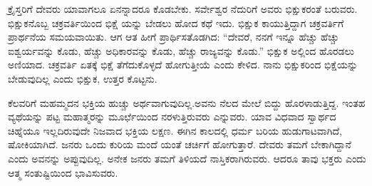 ಕ್ರೈಸ್ತರಿಗೆ ದೇವರು ಯಾವಾಗಲೂ ಏನನ್ನಾದರೂ ಕೊಡಬೇಕು. ಸರ್ವೇಶ್ವರ ನೆದುರಿಗೆ ಅವರು ಭಿಕ್ಷುಕರಂತೆ ಬರುವರು. ಭಿಕ್ಷುಕನೊಬ್ಬ ಚಕ್ರವರ್ತಿಯಿಂದ ಭಿಕ್ಷೆ ಯನ್ನು ಬೇಡಲು ಹೋದ ಕಥೆ ಇದು. ಭಿಕ್ಷುಕ ಕಾಯುತ್ತಿದ್ದಾಗ ಚಕ್ರವರ್ತಿಗೆ ಪ್ರಾರ್ಥನೆಯ ಸಮಯವಾಯಿತು. ಆಗ ಆತ ಹೀಗೆ ಪ್ರಾರ್ಥಿಸತೊಡಗಿದ: “ದೇವರೆ, ನನಗೆ ಇನ್ನೂ ಹೆಚ್ಚು ಹೆಚ್ಚು ಐಶ್ವರ್ಯವನ್ನು ಕೊಡು, ಹೆಚ್ಚು ಅಧಿಕಾರವನ್ನು ಕೊಡು, ಹೆಚ್ಚು ರಾಜ್ಯವನ್ನು ಕೊಡು.” ಭಿಕ್ಷುಕ ಅಲ್ಲಿಂದ ಹೊರಡಲು ಅಣಿಯಾದ. ಚಕ್ರವರ್ತಿ ಏತಕ್ಕೆ ಭಿಕ್ಷೆ ತೆಗೆದುಕೊಳ್ಳದೆ ಹೋಗುತ್ತೀಯೆ ಎಂದು ಕೇಳಿದ. ನಾನು ಭಿಕ್ಷುಕರಿಂದ ಭಿಕ್ಷೆಯನ್ನು ಬೇಡುವುದಿಲ್ಲ ಎಂದು ಭಿಕ್ಷುಕ, ಉತ್ತರ ಕೊಟ್ಟನು.

ಕೆಲವರಿಗೆ ಮಹಮ್ಮದನ ಭಕ್ತಿಯ ಹುಚ್ಚು ಅರ್ಥವಾಗುವುದಿಲ್ಲ.ಅವನು ನೆಲದ ಮೇಲೆ ಬಿದ್ದು ಹೊರಳಾಡುತ್ತಿದ್ದ. ಇಂತಹ ವ್ಯಥೆಯನ್ನು ಪಟ್ಟ ಮಹಾತ್ಮರನ್ನು ಮೂರ್ಛೆಯಿಂದ ನರಳುತ್ತಿರುವರು ಎನ್ನುವರು. ಯಾವ ವಿಧವಾದ ಸ್ವಾರ್ಥದ ಚಿಹ್ನೆಯೂ ಇಲ್ಲದಿರುವುದೇ ನಿಜವಾದ ಭಕ್ತಿಯ ಲಕ್ಷಣ. ಈಗಿನ ಕಾಲದಲ್ಲಿ ಧರ್ಮ ಬರಿಯ ಹುಡುಗಾಟವಾಗಿದೆ, ಷೋಕಿಯಾಗಿದೆ. ಜನರು ಒಂದು ಕುರಿಯ ಮಂದೆ ಯಂತೆ ಚರ್ಚಿಗೆ ಹೋಗುತ್ತಾರೆ. ದೇವರು ತಮಗೆ ಬೇಕಾಗಿದ್ದಾನೆ ಎಂದು ಅವನನ್ನು ಅಪ್ಪುವುದಿಲ್ಲ. ಅನೇಕ ಜನರು ತಮಗೆ ತಿಳಿಯದೆ ನಾಸ್ತಿಕರಾಗಿರುವರು. ಆದರೂ ತಾವು ಭಕ್ತರು ಎಂದು ಆತ್ಮ ಸಂತುಷ್ಟಿಯಿಂದ ಭಾವಿಸುವರು.

